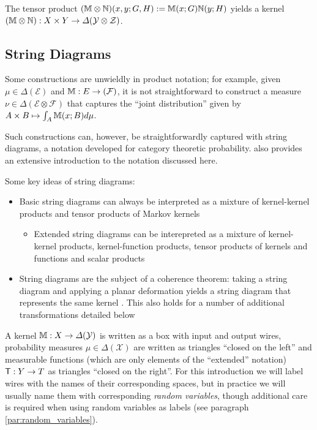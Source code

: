 The tensor product $(\mathbb{M}\otimes \mathbb{N})(x,y;G,H) := \mathbb{M}(x;G)\mathbb{N}(y;H)$ yields a kernel $(\mathbb{M}\otimes \mathbb{N}):X\times Y\to \Delta(\mathcal{Y}\otimes\mathcal{Z})$.

\subsection{String Diagrams}\label{ssec:mken_diagrams}

Some constructions are unwieldly in product notation; for example, given $\mu\in \Delta(\mathcal{E})$ and $\mathbb{M}:E\to (\mathcal{F})$, it is not straightforward to construct a measure $\nu\in\Delta(\mathcal{E}\otimes\mathcal{F})$ that captures the ``joint distribution'' given by $A\times B\mapsto \int_A \mathbb{M}(x;B)d\mu$. 

Such constructions can, however, be straightforwardly captured with string diagrams, a notation developed for category theoretic probability. \citet{cho_disintegration_2019} also provides an extensive introduction to the notation discussed here.

Some key ideas of string diagrams:
\begin{itemize}
	\item Basic string diagrams can always be interpreted as a mixture of kernel-kernel products and tensor products of Markov kernels
	\begin{itemize}
	\item Extended string diagrams can be interepreted as a mixture of kernel-kernel products, kernel-function products, tensor products of kernels and functions and scalar products 
	\end{itemize}
	\item String diagrams are the subject of a coherence theorem: taking a string diagram and applying a planar deformation yields a string diagram that represents the same kernel \citep{selinger_survey_2010}. This also holds for a number of additional transformations detailed below
\end{itemize}

A kernel $\mathbb{M}:X\to \Delta(\mathcal{Y})$ is written as a box with input and output wires, probability measures $\mu\in \Delta(\mathcal{X})$ are written as triangles ``closed on the left'' and measurable functions (which are only elements of the ``extended'' notation) $\mathsf{T}:Y\to T$ as triangles ``closed on the right''. For this introduction we will label wires with the names of their corresponding spaces, but in practice we will usually name them with corresponding \emph{random variables}, though additional care is required when using random variables as labels (see paragraph \ref{par:random_variables}).

